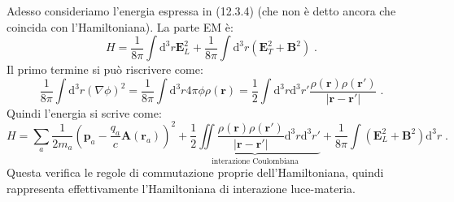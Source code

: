\documentclass[10pt,a4paper]{report}
\theoremstyle{definition}
\numberwithin{equation}{section}
\newcommand{\diff}[1][]{\mathrm{d}#1}
\begin{document}
Adesso consideriamo l'energia espressa in (12.3.4) (che non è detto ancora che coincida con l'Hamiltoniana). La parte EM è:
\begin{equation*}
H=\frac{1}{8\pi}\int\diff^3{r}\mathbf{E}_L^2+\frac{1}{8\pi}\int\diff^3{r}(\mathbf{E}_T^2+\mathbf{B}^2)\;.
\end{equation*}
Il primo termine si può riscrivere come:
\begin{equation}
\frac{1}{8\pi}\int\diff^3{r}(\nabla\phi)^2=\frac{1}{8\pi}\int\diff^3{r} 4\pi\phi\rho(\mathbf{r})=\frac{1}{2}\int\diff^3{r}\diff^3{r'}\frac{\rho(\mathbf{r})\rho(\mathbf{r}')}{|\mathbf{r}-\mathbf{r}'|}\;.
\end{equation}
Quindi l'energia si scrive come:
\begin{equation}
H=\sum_a \frac{1}{2m_a}\left(\mathbf{p}_a-\frac{q_a}{c}\mathbf{A}(\mathbf{r}_a)\right)^2+\underbrace{\frac{1}{2}\iint \frac{\rho(\mathbf{r})\rho(\mathbf{r}')}{|\mathbf{r}-\mathbf{r}'|}\diff^3{r}\diff^3{r'}}_{\mbox{interazione Coulombiana}}+\frac{1}{8\pi}\int (\mathbf{E}_L^2+\mathbf{B}^2)\diff^3{r}\;.
\end{equation}
Questa verifica le regole di commutazione proprie dell'Hamiltoniana, quindi rappresenta effettivamente l'Hamiltoniana di interazione luce-materia.
\end{document}
